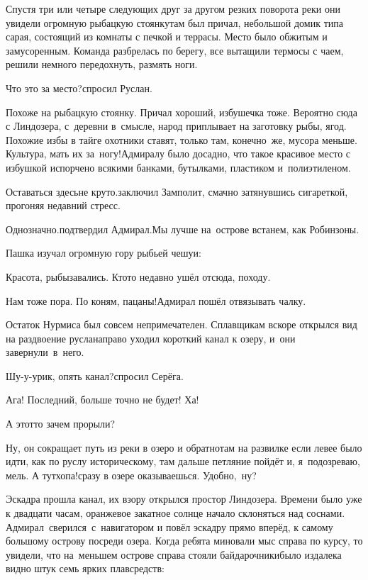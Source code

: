 Спустя три или четыре следующих друг за другом резких поворота реки они увидели огромную рыбацкую стоянку\mdash там был причал, небольшой домик типа сарая, состоящий из комнаты с печкой и террасы. Место было обжитым и замусоренным. Команда разбрелась по берегу, все вытащили термосы с чаем, решили немного передохнуть, размять ноги.

\diagdash Что это за место?\mdash спросил Руслан.

\diagdash Похоже на рыбацкую стоянку. Причал хороший, избушечка тоже. Вероятно сюда с Линдозера, с~деревни в~смысле, народ приплывает на заготовку рыбы, ягод. Похожие избы в тайге охотники ставят, только там, конечно~же, мусора меньше. Культура, мать их за~ногу!\mdash Адмиралу было досадно, что такое красивое место с избушкой испорчено всякими банками, бутылками, пластиком и~полиэтиленом.

\diagdash Оставаться здесь\mdash не круто.\mdash заключил Замполит, смачно затянувшись сигареткой, прогоняя недавний стресс.

\diagdash Однозначно.\mdash подтвердил Адмирал.\mdash Мы лучше на~острове встанем, как Робинзоны.

Пашка изучал огромную гору рыбьей чешуи:

\diagdash Красота, рыбы\mdash завались. Кто\sdash то недавно ушёл отсюда, походу.

\diagdash Нам тоже пора. По коням, пацаны!\mdash Адмирал пошёл отвязывать чалку.

Остаток Нурмиса был совсем непримечателен. Сплавщикам вскоре открылся вид на раздвоение русла\mdash направо уходил короткий канал к озеру, и~они завернули~в~него.

\diagdash Шу-у-урик, опять канал?\mdash спросил Серёга.

\diagdash Ага! Последний, больше точно не будет! Ха!

\diagdash А этот\sdash то зачем прорыли? 

\diagdash Ну, он сокращает путь из реки в озеро и обратно\mdash там на развилке если левее было идти, как по руслу историческому, там дальше петляние пойдёт и, я~подозреваю, мель. А тут\mdash хопа!\mdash сразу в озере оказываешься. Удобно,~ну?

Эскадра прошла канал, их взору открылся простор Линдозера. Времени было уже к двадцати часам, оранжевое закатное солнце начало склоняться над соснами. Адмирал~сверился~с~навигатором и повёл эскадру прямо вперёд, к самому большому острову посреди озера. Когда ребята миновали мыс справа по курсу, то увидели, что на~меньшем острове справа стояли байдарочники\mdash было издалека видно штук семь ярких плавсредств:

